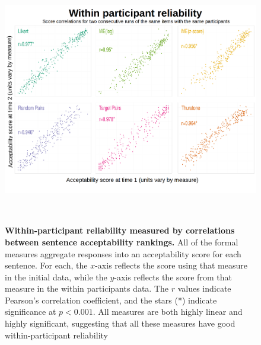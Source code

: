 \documentclass[doc]{apa6}
\newcommand{\initial}{{\sc initial}}
\newcommand{\withinppnt}{{\sc within participants}}
\begin{document}
\begin{figure}[t]
\centering
\includegraphics[height=11cm,keepaspectratio]{figures/within_cor.png}
\caption{{\small {\bf Within-participant reliability measured by correlations between sentence acceptability rankings.} All of the formal measures aggregate responses into an acceptability score for each sentence. For each, the $x$-axis reflects the score using that measure in the \initial{} data, while the $y$-axis reflects the score from that measure in the \withinppnt{} data. The $r$ values indicate Pearson's correlation coefficient, and the stars (*) indicate significance at $p<0.001$. All measures are both highly linear and highly significant, suggesting that all these measures have good within-participant reliability}}
\label{withincorrelations}
\end{figure}
\end{document}
